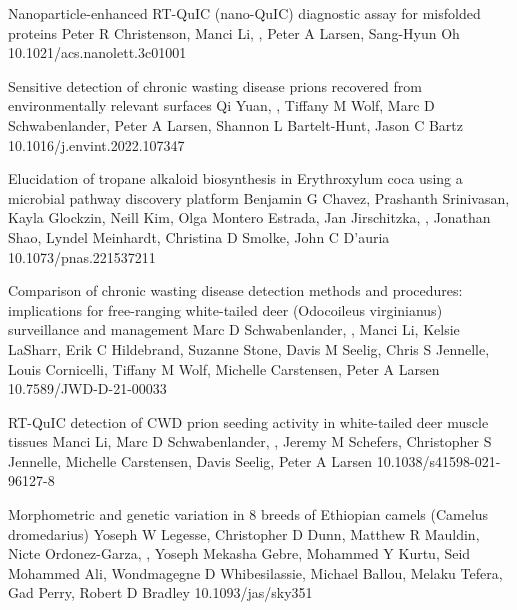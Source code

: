 \documentclass{resume}
\begin{document}
        \begin{samepage}

            {Nanoparticle-enhanced RT-QuIC (nano-QuIC) diagnostic assay for misfolded proteins}
            {Peter R Christenson, Manci Li, \me{}, Peter A Larsen, Sang-Hyun Oh}
            {10.1021/acs.nanolett.3c01001}

            {Sensitive detection of chronic wasting disease prions recovered from environmentally relevant surfaces}
            {Qi Yuan, \me{}, Tiffany M Wolf, Marc D Schwabenlander, Peter A Larsen, Shannon L Bartelt-Hunt, Jason C Bartz}
            {10.1016/j.envint.2022.107347}

            {Elucidation of tropane alkaloid biosynthesis in Erythroxylum coca using a microbial pathway discovery platform}
            {Benjamin G Chavez, Prashanth Srinivasan, Kayla Glockzin, Neill Kim, Olga Montero Estrada, Jan Jirschitzka, \me{}, Jonathan Shao, Lyndel Meinhardt, Christina D Smolke, John C D’auria}
            {10.1073/pnas.221537211}

            {Comparison of chronic wasting disease detection methods and procedures: implications for free-ranging white-tailed deer (Odocoileus virginianus) surveillance and management}
            {Marc D Schwabenlander, \me{}, Manci Li, Kelsie LaSharr, Erik C Hildebrand, Suzanne Stone, Davis M Seelig, Chris S Jennelle, Louis Cornicelli, Tiffany M Wolf, Michelle Carstensen, Peter A Larsen}
            {10.7589/JWD-D-21-00033}
            
            {RT-QuIC detection of CWD prion seeding activity in white-tailed deer muscle tissues}
            {Manci Li, Marc D Schwabenlander, \me{}, Jeremy M Schefers, Christopher S Jennelle, Michelle Carstensen, Davis Seelig, Peter A Larsen}
            {10.1038/s41598-021-96127-8}

            {Morphometric and genetic variation in 8 breeds of Ethiopian camels (Camelus dromedarius)}
            {Yoseph W Legesse, Christopher D Dunn, Matthew R Mauldin, Nicte Ordonez-Garza, \me{}, Yoseph Mekasha Gebre, Mohammed Y Kurtu, Seid Mohammed Ali, Wondmagegne D Whibesilassie, Michael Ballou, Melaku Tefera, Gad Perry, Robert D Bradley}
            {10.1093/jas/sky351}

        \end{samepage}
\end{document}

